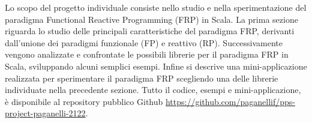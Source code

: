 \documentclass[../main.tex]{subfiles}
\begin{document}
Lo scopo del progetto individuale consiste nello studio e nella sperimentazione del paradigma Functional Reactive Programming (FRP) in Scala. La prima sezione riguarda lo studio delle principali caratteristiche del paradigma FRP, derivanti dall'unione dei paradigmi funzionale (FP) e reattivo (RP). Successivamente vengono analizzate e confrontate le possibili librerie per il paradigma FRP in Scala, sviluppando alcuni semplici esempi. Infine si descrive una mini-applicazione realizzata per sperimentare il paradigma FRP scegliendo una delle librerie individuate nella precedente sezione. Tutto il codice, esempi e mini-applicazione, è disponibile al repository pubblico Github \url{https://github.com/paganellif/pps-project-paganelli-2122}.
\end{document}
